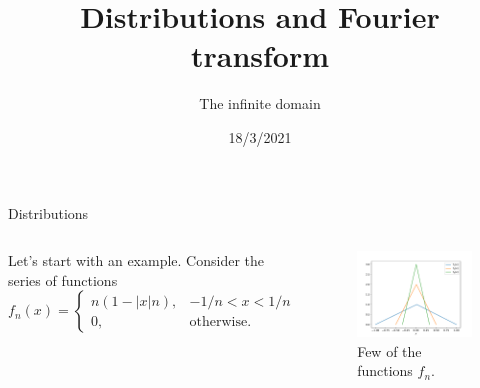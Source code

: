 

\title{Distributions and Fourier transform}
\subtitle{The infinite domain}
\date{18/3/2021}
\date{}


	
	\maketitle
	

\begin{frame}{Distributions}
	\begin{columns}
	Let's start with an example. Consider the series of functions
	\[ f_n(x) = \begin{cases}
		n(1 - |x|n), & -1/n < x < 1/n \\
		0, & \text{otherwise.}
	\end{cases} \]
	
	\begin{figure}
		\centering
		\includegraphics[width=\linewidth]{triangles.pdf}
		\caption{Few of the functions $f_n$.}
	\end{figure}
	\end{columns}
\end{frame}

